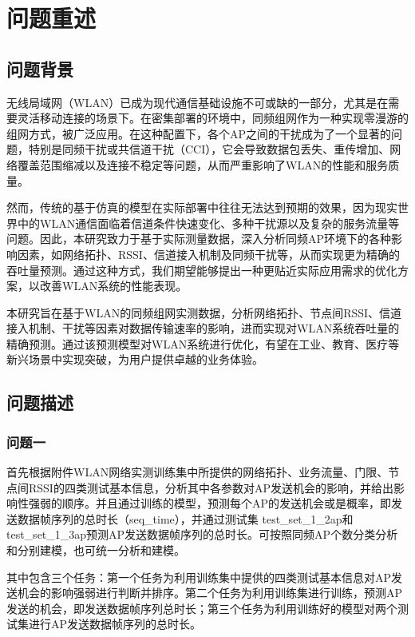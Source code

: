 \documentclass[bwprint]{gmcmthesis}
\begin{document}
\pagestyle{plain}

\maketoc

\clearpage

\section{问题重述}

\subsection{问题背景}   %

无线局域网（WLAN）已成为现代通信基础设施不可或缺的一部分，尤其是在需要灵活移动连接的场景下。在密集部署的环境中，同频组网作为一种实现零漫游的组网方式，被广泛应用。在这种配置下，各个AP之间的干扰成为了一个显著的问题，特别是同频干扰或共信道干扰（CCI），它会导致数据包丢失、重传增加、网络覆盖范围缩减以及连接不稳定等问题，从而严重影响了WLAN的性能和服务质量。

然而，传统的基于仿真的模型在实际部署中往往无法达到预期的效果，因为现实世界中的WLAN通信面临着信道条件快速变化、多种干扰源以及复杂的服务流量等问题。因此，本研究致力于基于实际测量数据，深入分析同频AP环境下的各种影响因素，如网络拓扑、RSSI、信道接入机制及同频干扰等，从而实现更为精确的吞吐量预测。通过这种方式，我们期望能够提出一种更贴近实际应用需求的优化方案，以改善WLAN系统的性能表现。

本研究旨在基于WLAN的同频组网实测数据，分析网络拓扑、节点间RSSI、信道接入机制、干扰等因素对数据传输速率的影响，进而实现对WLAN系统吞吐量的精确预测。通过该预测模型对WLAN系统进行优化，有望在工业、教育、医疗等新兴场景中实现突破，为用户提供卓越的业务体验。

\subsection{问题描述}
\subsubsection{问题一}
首先根据附件WLAN网络实测训练集中所提供的网络拓扑、业务流量、门限、节点间RSSI的四类测试基本信息，分析其中各参数对AP发送机会的影响，并给出影响性强弱的顺序。并且通过训练的模型，预测每个AP的发送机会或是概率，即发送数据帧序列的总时长（seq\_time），并通过测试集 test\_set\_1\_2ap和test\_set\_1\_3ap预测AP发送数据帧序列的总时长。可按照同频AP个数分类分析和分别建模，也可统一分析和建模。

其中包含三个任务：第一个任务为利用训练集中提供的四类测试基本信息对AP发送机会的影响强弱进行判断并排序。第二个任务为利用训练集进行训练，预测AP发送的机会，即发送数据帧序列总时长；第三个任务为利用训练好的模型对两个测试集进行AP发送数据帧序列的总时长。
\end{document}
